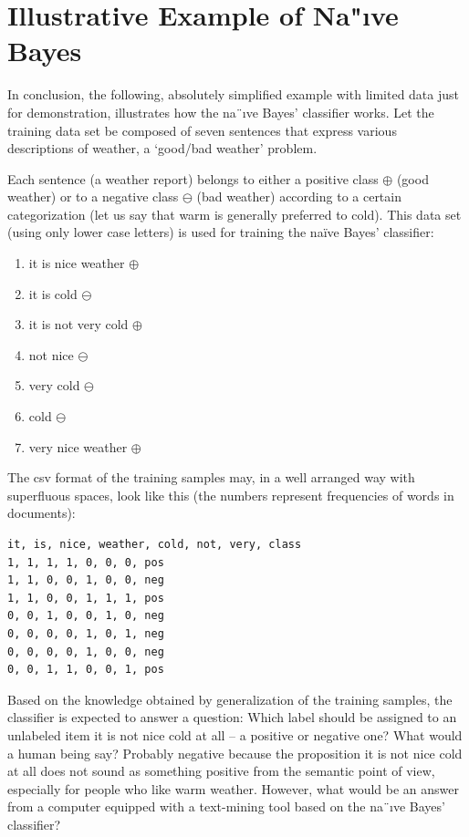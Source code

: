 \section{ Illustrative Example of Na"ıve Bayes}

In conclusion, the following, absolutely simplified example with limited data just
for demonstration, illustrates how the na¨ıve Bayes’ classifier works. Let the training data set be composed of seven sentences that express various descriptions of
weather, a ‘good/bad weather’ problem.

Each sentence (a weather report) belongs to either a positive class $\oplus$ (good
weather) or to a negative class $\ominus$ (bad weather) according to a certain categorization (let us say that warm is generally preferred to cold). This data set (using
only lower case letters) is used for training the na\"ive Bayes' classifier:

\begin{enumerate}
    \item it is nice weather $\oplus$
    \item it is cold $\ominus$
    \item it is not very cold $\oplus$
    \item not nice $\ominus$
    \item very cold $\ominus$
    \item cold $\ominus$
    \item very nice weather $\oplus$
\end{enumerate}

The csv format of the training samples may, in a well arranged way with
superfluous spaces, look like this (the numbers represent frequencies of words in
documents):

\begin{verbatim}
it, is, nice, weather, cold, not, very, class
1, 1, 1, 1, 0, 0, 0, pos
1, 1, 0, 0, 1, 0, 0, neg
1, 1, 0, 0, 1, 1, 1, pos
0, 0, 1, 0, 0, 1, 0, neg
0, 0, 0, 0, 1, 0, 1, neg
0, 0, 0, 0, 1, 0, 0, neg
0, 0, 1, 1, 0, 0, 1, pos
\end{verbatim}

Based on the knowledge obtained by generalization of the training samples,
the classifier is expected to answer a question: Which label should be assigned
to an unlabeled item it is not nice cold at all – a positive or negative one? What
would a human being say? Probably negative because the proposition it is not
nice cold at all does not sound as something positive from the semantic point
of view, especially for people who like warm weather. However, what would be
an answer from a computer equipped with a text-mining tool based on the na¨ıve
Bayes’ classifier?

